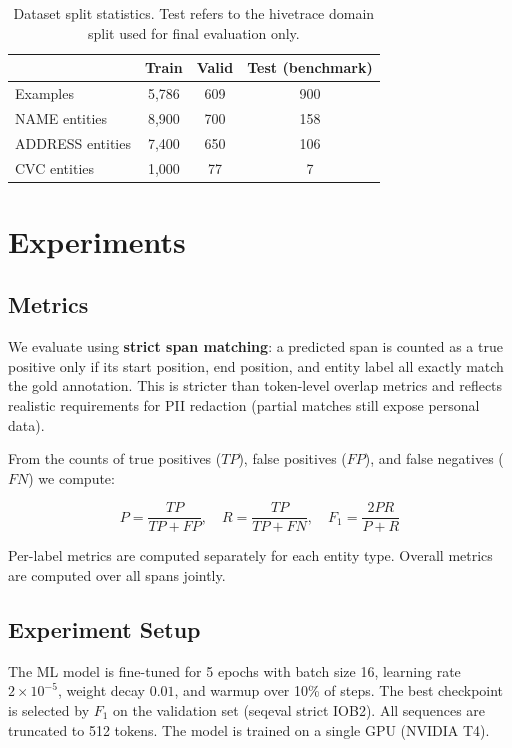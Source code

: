 \documentclass{article}
\begin{document}
\begin{table}[tbh!]
\begin{center}
\begin{tabular}[t]{|l|ccc|}
\hline
 & Train & Valid & Test (benchmark) \\
\hline
Examples & 5,786 & 609 & 900 \\
NAME entities & 8,900 & 700 & 158 \\
ADDRESS entities & 7,400 & 650 & 106 \\
CVC entities & 1,000 & 77 & 7 \\
\hline
\end{tabular}
\caption{Dataset split statistics. Test refers to the hivetrace domain split used for final evaluation only.}
\label{tab:statistics}
\end{center}
\end{table}

\section{Experiments}

\subsection{Metrics}

We evaluate using \textbf{strict span matching}: a predicted span is counted as a true positive only if its start position, end position, and entity label all exactly match the gold annotation. This is stricter than token-level overlap metrics and reflects realistic requirements for PII redaction (partial matches still expose personal data).

From the counts of true positives ($TP$), false positives ($FP$), and false negatives ($FN$) we compute:

$$P = \frac{TP}{TP + FP}, \quad R = \frac{TP}{TP + FN}, \quad F_1 = \frac{2PR}{P + R}$$

Per-label metrics are computed separately for each entity type. Overall metrics are computed over all spans jointly.

\subsection{Experiment Setup}

The ML model is fine-tuned for 5 epochs with batch size 16, learning rate $2 \times 10^{-5}$, weight decay $0.01$, and warmup over 10\% of steps. The best checkpoint is selected by $F_1$ on the validation set (seqeval strict IOB2). All sequences are truncated to 512 tokens. The model is trained on a single GPU (NVIDIA T4).
\end{document}
